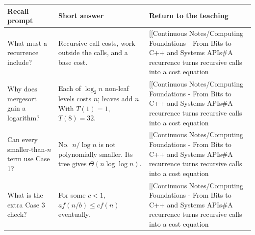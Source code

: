 {\def\LTcaptype{none} %
\begin{longtable}[]{@{}
  >{\raggedright\arraybackslash}p{}
  >{\raggedright\arraybackslash}p{}
  >{\raggedright\arraybackslash}p{}@{}}
\toprule\noalign{}
\begin{minipage}[b]{\linewidth}\raggedright
Recall prompt
\end{minipage} & \begin{minipage}[b]{\linewidth}\raggedright
Short answer
\end{minipage} & \begin{minipage}[b]{\linewidth}\raggedright
Return to the teaching
\end{minipage} \\
\midrule\noalign{}
\endhead
\bottomrule\noalign{}
\endlastfoot
What must a recurrence include? & Recursive-call costs, work outside the calls, and a base cost. & {[}{[}Continuous Notes/Computing Foundations - From Bits to C++ and Systems APIs\#A recurrence turns recursive calls into a cost equation \\
Why does mergesort gain a logarithm? & Each of \(\log_2 n\) non-leaf levels costs \(n\); leaves add \(n\). With \(T(1)=1\), \(T(8)=32\). & {[}{[}Continuous Notes/Computing Foundations - From Bits to C++ and Systems APIs\#A recurrence turns recursive calls into a cost equation \\
Can every smaller-than-\(n\) term use Case 1? & No.~\(n/\log n\) is not polynomially smaller. Its tree gives \(\Theta(n\log\log n)\). & {[}{[}Continuous Notes/Computing Foundations - From Bits to C++ and Systems APIs\#A recurrence turns recursive calls into a cost equation \\
What is the extra Case 3 check? & For some \(c<1\), \(a f(n/b)\le c f(n)\) eventually. & {[}{[}Continuous Notes/Computing Foundations - From Bits to C++ and Systems APIs\#A recurrence turns recursive calls into a cost equation \\
\end{longtable}
}
